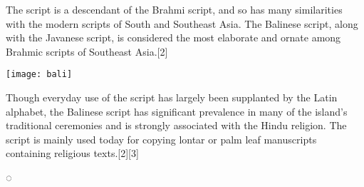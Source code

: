 The script is a descendant of the Brahmi script, and so has many similarities with the modern scripts of South and Southeast Asia. The Balinese script, along with the Javanese script, is considered the most elaborate and ornate among Brahmic scripts of Southeast Asia.[2]

\texttt{[image: bali]}


Though everyday use of the script has largely been supplanted by the Latin alphabet, the Balinese script has significant prevalence in many of the island's traditional ceremonies and is strongly associated with the Hindu religion. The script is mainly used today for copying lontar or palm leaf manuscripts containing religious texts.[2][3]



{\indicative ◌ }

\setcounter{under}{"1B00}


